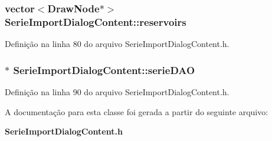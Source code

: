 \subsubsection[{reservoirs}]{\setlength{\rightskip}{0pt plus 5cm}vector$<${\bf Draw\+Node}$\ast$$>$ Serie\+Import\+Dialog\+Content\+::reservoirs\hspace{0.3cm}{\ttfamily [protected]}}\label{class_serie_import_dialog_content_a1f22da51463498c7af655385f7096689}


Definição na linha 80 do arquivo Serie\+Import\+Dialog\+Content.\+h.

\subsubsection[{serie\+D\+AO}]{$\ast$ Serie\+Import\+Dialog\+Content\+::serie\+D\+AO\hspace{0.3cm}{\ttfamily [protected]}}\label{class_serie_import_dialog_content_a2f566e7a70beddc6fbed63e5212585a8}


Definição na linha 90 do arquivo Serie\+Import\+Dialog\+Content.\+h.



A documentação para esta classe foi gerada a partir do seguinte arquivo\+:\begin{DoxyCompactItemize}
\item 
{\bf Serie\+Import\+Dialog\+Content.\+h}\end{DoxyCompactItemize}
